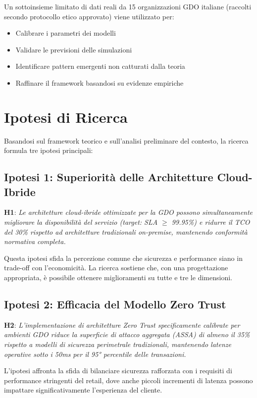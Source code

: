 Un sottoinsieme limitato di dati reali da 15 organizzazioni GDO italiane (raccolti secondo protocollo etico approvato) viene utilizzato per:
\begin{itemize}
\item Calibrare i parametri dei modelli
\item Validare le previsioni delle simulazioni
\item Identificare pattern emergenti non catturati dalla teoria
\item Raffinare il framework basandosi su evidenze empiriche
\end{itemize}

\section{Ipotesi di Ricerca}

Basandosi sul framework teorico e sull'analisi preliminare del contesto, la ricerca formula tre ipotesi principali:

\subsection{Ipotesi 1: Superiorità delle Architetture Cloud-Ibride}

\textbf{H1}: \textit{Le architetture cloud-ibride ottimizzate per la GDO possono simultaneamente migliorare la disponibilità del servizio (target: SLA $\geq$ 99.95\%) e ridurre il TCO del 30\% rispetto ad architetture tradizionali on-premise, mantenendo conformità normativa completa.}

Questa ipotesi sfida la percezione comune che sicurezza e performance siano in trade-off con l'economicità. La ricerca sostiene che, con una progettazione appropriata, è possibile ottenere miglioramenti su tutte e tre le dimensioni.

\subsection{Ipotesi 2: Efficacia del Modello Zero Trust}

\textbf{H2}: \textit{L'implementazione di architetture Zero Trust specificamente calibrate per ambienti GDO riduce la superficie di attacco aggregata (ASSA) di almeno il 35\% rispetto a modelli di sicurezza perimetrale tradizionali, mantenendo latenze operative sotto i 50ms per il 95° percentile delle transazioni.}

L'ipotesi affronta la sfida di bilanciare sicurezza rafforzata con i requisiti di performance stringenti del retail, dove anche piccoli incrementi di latenza possono impattare significativamente l'esperienza del cliente.

